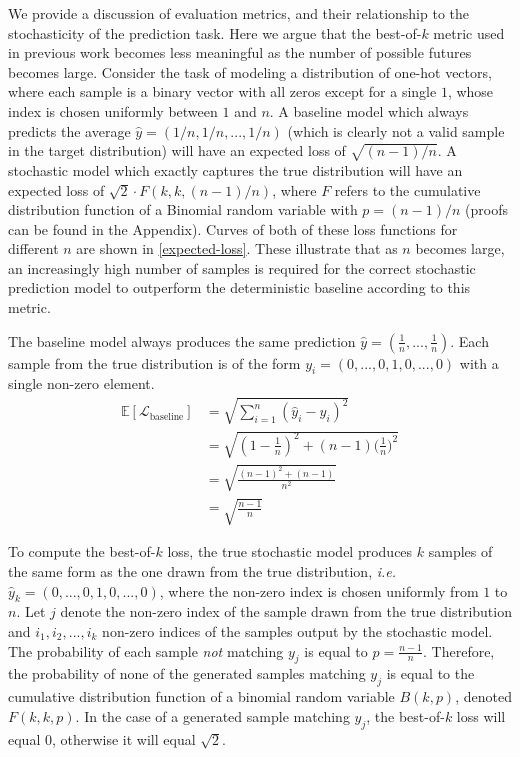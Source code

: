\documentclass{article}
\begin{document}
\begin{appendices}
We provide a discussion of evaluation metrics, and their relationship to the stochasticity of the prediction task.
Here we argue that the best-of-$k$ metric used in previous work \citep{Walker2016, Babaeizadeh2018, Denton2018} becomes less meaningful as the number of possible futures becomes large.
Consider the task of modeling a distribution of one-hot vectors, where each sample is a binary vector with all zeros except for a single $1$, whose index is chosen uniformly between $1$ and $n$.
A baseline model which always predicts the average $\hat{y} = (1/n, 1/n, ..., 1/n)$ (which is clearly not a valid sample in the target distribution) will have an expected loss of $\sqrt{(n-1)/n}$.
A stochastic model which exactly captures the true distribution will have an expected loss of $\sqrt{2} \cdot F(k, k, (n-1)/n)$, where $F$ refers to the cumulative distribution function of a Binomial random variable with $p=(n-1)/n$ (proofs can be found in the Appendix).
Curves of both of these loss functions for different $n$ are shown in \cref{expected-loss}.
These illustrate that as $n$ becomes large, an increasingly high number of samples is required for the correct stochastic prediction model to outperform the deterministic baseline according to this metric.


The baseline model always produces the same prediction $\hat{y} = (\frac{1}{n}, ..., \frac{1}{n})$.
Each sample from the true distribution is of the form $y_i = (0, ..., 0, 1, 0, ..., 0)$ with a single non-zero element.
\begin{align}
  \mathbb{E}[\mathcal{L}_{\mbox{baseline}}] &= \sqrt{\sum_{i=1}^n (\hat{y}_i - y_i)^2} \\
  &= \sqrt{(1-\frac{1}{n})^2 + (n-1)\Big ( \frac{1}{n} \Big )^2} \\
  &= \sqrt{\frac{(n-1)^2 + (n-1)}{n^2}} \\
  &= \sqrt{\frac{n-1}{n}}
\end{align}

To compute the best-of-$k$ loss, the true stochastic model produces $k$ samples of the same form as the one drawn from the true distribution, \emph{i.e.}\ $\hat{y}_k = (0, ..., 0, 1, 0, ..., 0)$, where the non-zero index is chosen uniformly from $1$ to $n$.
Let $j$ denote the non-zero index of the sample drawn from the true distribution and $i_1, i_2, ..., i_k$ non-zero indices of the samples output by the stochastic model.
The probability of each sample \textit{not} matching $y_j$ is equal to $p=\frac{n-1}{n}$.
Therefore, the probability of none of the generated samples matching $y_j$ is equal to the cumulative distribution function of a binomial random variable $B(k, p)$, denoted $F(k, k, p)$.
In the case of a generated sample matching $y_j$, the best-of-$k$ loss will equal 0, otherwise it will equal $\sqrt{2}$.


\end{appendices}
\end{document}
